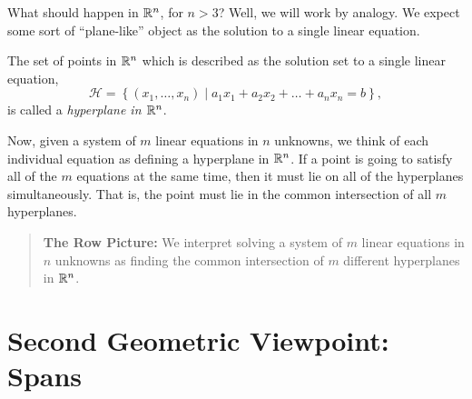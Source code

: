\documentclass[00-livre-main.tex]{subfiles}
\begin{document}
What should happen in $\mathbb{R}^n$, for $n>3$? Well, we will work by analogy. We expect some sort of ``plane-like'' object as the solution to a single linear equation.

\begin{definition}
The set of points in $\mathbb{R}^n$ which is described as the solution set to a single linear equation,
\[
\mathcal{H} = \left\{ (x_1,\ldots, x_n) \middle| a_1x_1 + a_2 x_2 + \dots + a_n x_n = b \right\} ,
\]
is called a \emph{hyperplane in $\mathbb{R}^n$}.
\end{definition}

Now, given a system of $m$ linear equations in $n$ unknowns, we think of each individual equation as defining a hyperplane in $\mathbb{R}^n$. If a point is going to satisfy all of the $m$ equations at the same time, then it must lie on all of the hyperplanes simultaneously. That is, the point must lie in the common intersection of all $m$ hyperplanes.

\begin{quote}
\textbf{The Row Picture:} We interpret solving a system of $m$ linear equations in $n$ unknowns as finding the common intersection of $m$ different hyperplanes in $\mathbb{R}^n$.
\end{quote}

\section{Second Geometric Viewpoint: Spans}
\end{document}
